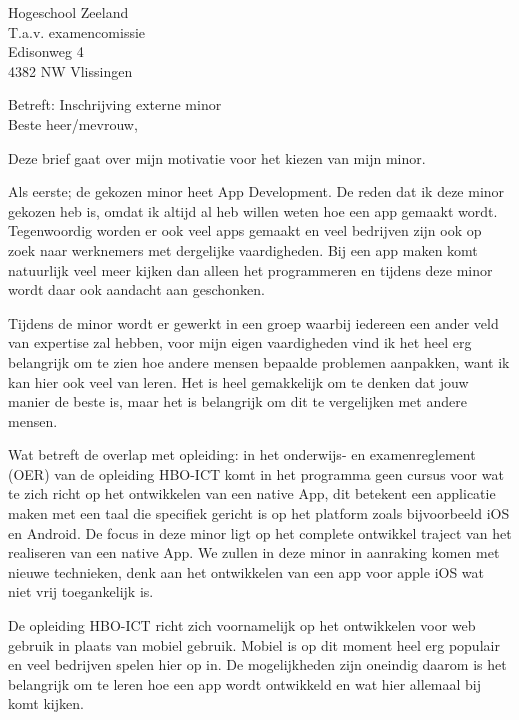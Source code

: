 \documentclass{letter}
\begin{document}
\begin{letter}{Hogeschool Zeeland \\ T.a.v. examencomissie \\ Edisonweg 4 \\ 4382 NW Vlissingen}

\opening{Betreft: Inschrijving externe minor \newline \\ Beste heer/mevrouw,}

Deze brief gaat over mijn motivatie voor het kiezen van mijn minor.

Als eerste; de gekozen minor heet App Development. De reden dat ik deze minor gekozen heb is, omdat ik altijd al heb willen weten hoe een app gemaakt wordt. Tegenwoordig worden er ook veel apps gemaakt en veel bedrijven zijn ook op zoek naar werknemers met dergelijke vaardigheden. Bij een app maken komt natuurlijk veel meer kijken dan alleen het programmeren en tijdens deze minor wordt daar ook aandacht aan geschonken.

\newline

Tijdens de minor wordt er gewerkt in een groep waarbij iedereen een ander veld van expertise zal hebben, voor mijn eigen vaardigheden vind ik het heel erg belangrijk om te zien hoe andere mensen bepaalde problemen aanpakken, want ik kan hier ook veel van leren. Het is heel gemakkelijk om te denken dat jouw manier de beste is, maar het is belangrijk om dit te vergelijken met andere mensen.

\newline

Wat betreft de overlap met opleiding: in het onderwijs- en examenreglement (OER) van de opleiding HBO-ICT komt in het programma geen cursus voor wat te zich richt op het ontwikkelen van een native App, dit betekent een applicatie maken met een taal die specifiek gericht is op het platform zoals bijvoorbeeld iOS en Android. De focus in deze minor ligt op het complete ontwikkel traject van het realiseren van een native App. We zullen in deze minor in aanraking komen met nieuwe technieken, denk aan het ontwikkelen van een app voor apple iOS wat niet vrij toegankelijk is. 

\newline

De opleiding HBO-ICT richt zich voornamelijk op het ontwikkelen voor web gebruik in plaats van mobiel gebruik. Mobiel is op dit moment heel erg populair en veel bedrijven spelen hier op in. 
De mogelijkheden zijn oneindig daarom is het belangrijk om te leren hoe een app wordt ontwikkeld en wat hier allemaal bij komt kijken.


\end{letter}
\end{document}
